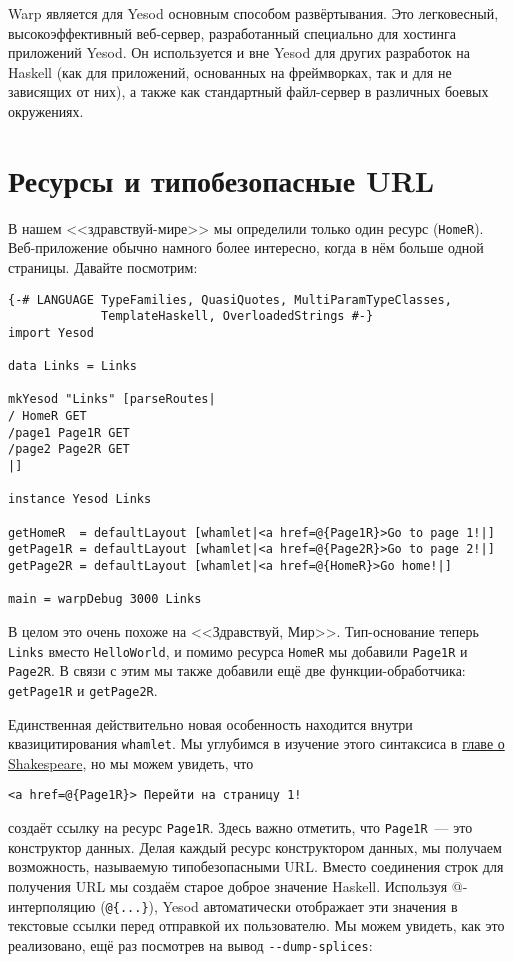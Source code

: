 Warp является для Yesod основным способом развёртывания. Это легковесный,
высокоэффективный веб-сервер, разработанный специально для хостинга приложений Yesod. Он
используется и вне Yesod для других разработок на Haskell (как для приложений, основанных
на фреймворках, так и для не зависящих от них), а также как стандартный файл-сервер в
различных боевых окружениях.

\section{Ресурсы и типобезопасные URL}

В нашем <<здравствуй-мире>> мы определили только один ресурс
(\lstinline!HomeR!). Веб-приложение обычно намного более интересно, когда в нём больше
одной страницы. Давайте посмотрим:

\begin{lstlisting}
{-# LANGUAGE TypeFamilies, QuasiQuotes, MultiParamTypeClasses,
             TemplateHaskell, OverloadedStrings #-}
import Yesod

data Links = Links

mkYesod "Links" [parseRoutes|
/ HomeR GET
/page1 Page1R GET
/page2 Page2R GET
|]

instance Yesod Links

getHomeR  = defaultLayout [whamlet|<a href=@{Page1R}>Go to page 1!|]
getPage1R = defaultLayout [whamlet|<a href=@{Page2R}>Go to page 2!|]
getPage2R = defaultLayout [whamlet|<a href=@{HomeR}>Go home!|]

main = warpDebug 3000 Links
\end{lstlisting}

В целом это очень похоже на <<Здравствуй, Мир>>. Тип-основание теперь \lstinline!Links!
вместо \lstinline!HelloWorld!, и помимо ресурса \lstinline!HomeR! мы добавили
\lstinline!Page1R! и \lstinline!Page2R!. В связи с этим мы также добавили ещё две
функции-обработчика: \lstinline!getPage1R! и \lstinline!getPage2R!.

Единственная действительно новая особенность находится внутри квазицитирования
\lstinline'whamlet'. Мы углубимся в изучение этого синтаксиса в
\hyperref[chap:shakespeare]{главе о Shakespeare}, но мы можем увидеть, что

\begin{lstlisting}
<a href=@{Page1R}> Перейти на страницу 1!
\end{lstlisting}
создаёт ссылку на ресурс \lstinline!Page1R!. Здесь важно отметить, что \lstinline!Page1R!~---
это конструктор данных. Делая каждый ресурс конструктором данных, мы получаем
возможность, называемую типобезопасными URL. Вместо соединения строк для получения URL мы
создаём старое доброе значение Haskell. Используя @-интерполяцию (\lstinline!@{...}!),
Yesod автоматически отображает эти значения в текстовые ссылки перед отправкой их
пользователю. Мы можем увидеть, как это реализовано, ещё раз посмотрев на вывод
\lstinline!--dump-splices!:

